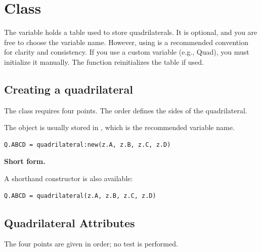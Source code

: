 \newpage
\section{Class }

\vspace{1em}
The variable  holds a table used to store quadrilaterals. It is optional, and you are free to choose the variable name. However, using  is a recommended convention for clarity and consistency. If you use a custom variable (e.g., Quad), you must initialize it manually. The  function reinitializes the  table if used.


\subsection{Creating a quadrilateral}
\label{sub:creating_a_quadrilateral}
The  class requires four points. The order defines the sides of the quadrilateral.

\medskip
The object is usually stored in , which is the recommended variable name.

\begin{mybox}
\begin{verbatim}
Q.ABCD = quadrilateral:new(z.A, z.B, z.C, z.D)
\end{verbatim}
\end{mybox}

\textbf{Short form.}

A shorthand constructor is also available:

\begin{mybox}
\begin{verbatim}
Q.ABCD = quadrilateral(z.A, z.B, z.C, z.D)
\end{verbatim}
\end{mybox}

\subsection{Quadrilateral Attributes}
The four points are given in order; no test is performed.

\begin{center}
\end{center}


